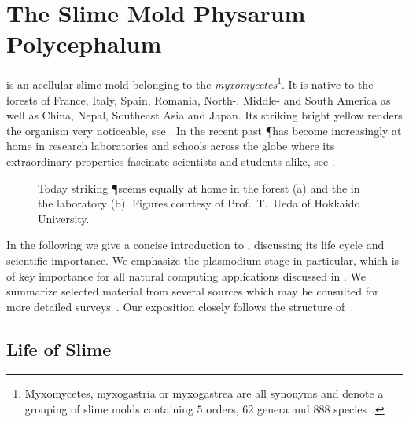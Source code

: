 \section{The Slime Mold Physarum Polycephalum}

	\Pp is an acellular slime mold belonging to the \emph{myxomycetes}\footnote{Myxomycetes, myxogastria or myxogastrea are all synonyms and denote a grouping of slime molds containing $5$ orders, $62$ genera and $888$ species~\cite{ainsworth2008ainsworth}.}. It is native to the forests of France, Italy, Spain, Romania, North-, Middle- and South America as well as China, Nepal, Southeast Asia and Japan. Its striking bright yellow renders the organism very noticeable, see . In the recent past \P has become increasingly at home in research laboratories and schools across the globe where its extraordinary properties fascinate scientists and students alike, see .

	\begin{figure}[!htp]
		\centering
		\qquad
		\caption[\P exploring various environments]{Today striking \P seems equally at home in the forest (a) and the in the laboratory (b). Figures courtesy of Prof.~T.~Ueda of Hokkaido University.}
		\label{fig:exploration}
	\end{figure}

	In the following we give a concise introduction to \Pp, discussing its life cycle and scientific importance. We emphasize the plasmodium stage in particular, which is of key importance for all natural computing applications discussed in . We summarize selected material from several sources which may be consulted for more detailed surveys~\cite{stephenson1994myxomycetes,nowotny2000myxomyceten,grube2016physarum,Sauer1986,Mayne2016,lifecycle}. Our exposition closely follows the structure of~\cite{nowotny2000myxomyceten}.
	
	\FloatBarrier
	
	\subsection{Life of Slime}



